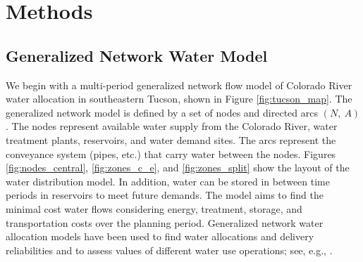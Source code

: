 \documentclass[12pt]{amsart}
\begin{document}


\section{Methods}
\label{sec:methods}
\subsection{Generalized Network Water Model} 
\label{sec:network_model}

We begin with a multi-period generalized network flow model of Colorado River water allocation in southeastern Tucson, shown in Figure \ref{fig:tucson_map}.
The generalized network model is defined by a set of nodes and directed arcs $(N,\: A)$.
The nodes represent available water supply from the Colorado River, water treatment plants, reservoirs, and water demand sites.
The arcs represent the conveyance system (pipes, etc.) that carry water between the nodes.
Figures \ref{fig:nodes_central}, \ref{fig:zones_c_e}, and \ref{fig:zones_split} show the layout of the water distribution model.
In addition, water can be stored in between time periods in reservoirs to meet future demands.
The model aims to find the minimal cost water flows considering energy, treatment, storage, and transportation costs over the planning period. 
Generalized network water allocation models have been used to find water allocations and delivery reliabilities and to assess values of different water use operations; see, e.g., \cite{draper_etal_03}. 
\end{document}
